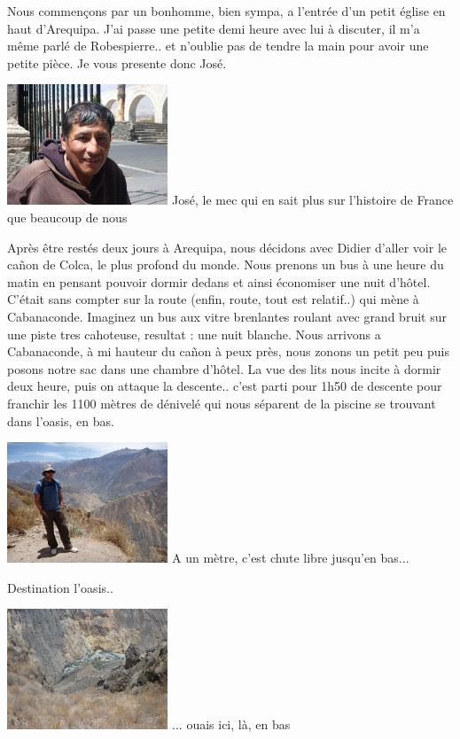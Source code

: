 \begin{multicols}{2}
Nous commençons par un bonhomme, bien sympa, a l'entrée d'un petit église en haut d'Arequipa. J'ai passe une petite demi heure avec lui à discuter, il m'a même parlé de Robespierre.. et n'oublie pas de tendre la main pour avoir une petite pièce. Je vous presente donc José.

\hspace*{-0.65cm}
\includegraphics[width=4.8cm]{articles/Arequipa-colca-titicaca/1256606933jPp4.jpg}
José, le mec qui en sait plus sur l'histoire de France que beaucoup de nous

Après être restés deux jours à Arequipa, nous décidons avec Didier d'aller voir le cañon de Colca, le plus profond du monde. Nous prenons un bus à une heure du matin en pensant pouvoir dormir dedans et ainsi économiser une nuit d'hôtel. C'était sans compter sur la route (enfin, route, tout est relatif..) qui mène à Cabanaconde. Imaginez un bus aux vitre brenlantes roulant avec grand bruit sur une piste tres cahoteuse, resultat : une nuit blanche. Nous arrivons a Cabanaconde, à mi hauteur du cañon à peux près, nous zonons un petit peu puis posons notre sac dans une chambre d'hôtel. La vue des lits nous incite à dormir deux heure, puis on attaque la descente.. c'est parti pour 1h50 de descente pour franchir les 1100 mètres de dénivelé qui nous séparent de la piscine se trouvant dans l'oasis, en bas.

\hspace*{-0.65cm}
\includegraphics[width=4.8cm]{articles/Arequipa-colca-titicaca/12566073542gHb.jpg}
A un mètre, c'est chute libre jusqu'en bas...

Destination l'oasis..

\hspace*{-0.65cm}
\includegraphics[width=4.8cm]{articles/Arequipa-colca-titicaca/1256607360xfpT.jpg}
... ouais ici, là, en bas


\end{multicols}
